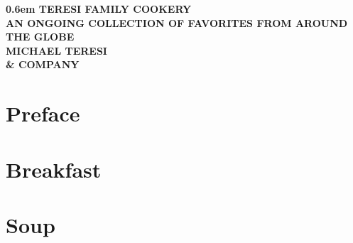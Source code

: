 \frontmatter
\begin{titlepage}
\onecolumn
\pagestyle{empty}
\newcommand\nbvspace[1][3]{\vspace*{\stretch{#1}}}
\newcommand\nbstretchyspace{\spaceskip0.5em plus 0.25em minus 0.25em}
\newcommand{\nbtitlestretch}{\spaceskip0.6em}
{
	\centering
	\bfseries
	\nbvspace[1]
	\Huge
	{\nbtitlestretch
		TERESI FAMILY COOKERY
	}\\
	\nbvspace[1]
	\footnotesize
	AN ONGOING COLLECTION OF FAVORITES FROM AROUND THE GLOBE\\
	\nbvspace[1]
	\Large MICHAEL TERESI \\ \small \& COMPANY\\
	\nbvspace[1]
	\hspace{1em}  %
	\vfill
}
\end{titlepage}

\dominitoc  %
\nomtcrule  %

\tableofcontents


\chapter*{Preface}
\enlargethispage{5\baselineskip}  %


\clearpage

\mainmatter

\setcounter{mtc}{0}  %
\mtcaddchapter       %
\chapter{Breakfast}
\minitoc
\clearpage



\chapter{Soup}
\minitoc
\clearpage






